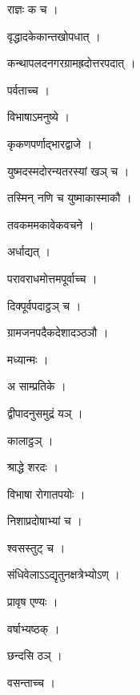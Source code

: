 \documentclass[10pt, openany]{book}
\begin{document}
\noindent राज्ञः क च ।

\noindent वृद्धादकेकान्तखोपधात् ।

\noindent कन्थापलदनगरग्रामह्रदोत्तरपदात् ।

\noindent पर्वताच्च ।

\noindent विभाषाऽमनुष्ये ।

\noindent कृकणपर्णाद्भारद्वाजे ।

\noindent युष्मदस्मदोरन्यतरस्यां खञ् च ।

\noindent तस्मिन् नणि च युष्माकास्माकौ ।

\noindent तवकममकावेकवचने ।

\noindent अर्धाद्यत् ।

\noindent परावराधमोत्तमपूर्वाच्च ।

\noindent दिक्पूर्वपदाट्ठञ् च ।

\noindent ग्रामजनपदैकदेशादञ्ठञौ ।

\noindent मध्यान्मः ।

\noindent अ साम्प्रतिके ।

\noindent द्वीपादनुसमुद्रं यञ् ।

\noindent कालाट्ठञ् ।

\noindent श्राद्धे शरदः ।

\noindent विभाषा रोगातपयोः ।

\noindent निशाप्रदोषाभ्यां च ।

\noindent श्वसस्तुट् च ।

\noindent संधिवेलाऽऽद्यृतुनक्षत्रेभ्योऽण् ।

\noindent प्रावृष एण्यः ।

\noindent वर्षाभ्यष्ठक् ।

\noindent छन्दसि ठञ् ।

\noindent वसन्ताच्च ।
\end{document}
